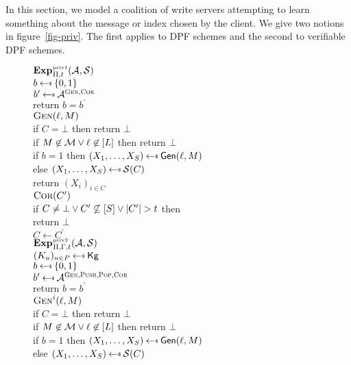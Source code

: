 %
\label{sec-security}

In this section, we model a coalition of write servers attempting to learn
something about the message or index chosen by the client. We give two notions
in figure~\ref{fig-priv}.
The first applies to DPF schemes and the second to verifiable DPF schemes.
\begin{figure}[t]
  \newcommand{\ctr}{\flagfont{ctr}}
  {
    \underline{$\game{\privone}_{\dpf,t}(\advA,\advS)$}\\[2pt]
    $b \getsr \bits$\\
    $b^\prime \getsr \advA^{\GENO,\CORO}$\\
    return $b=b^\prime$
    \\[6pt]
    \underline{$\textsc{Gen}(\ell,M)$}\\[2pt]
    if $C = \bot$ then return $\bot$\\
    if $M \not\in \mathcal{M} \vee \ell \not\in [L]$ then return $\bot$\\
    if $b=1$ then $(X_1, \ldots, X_\sharect) \getsr \gen(\idx,\msg)$\\
    else $(X_1, \ldots, X_\sharect) \getsr \advS(C)$\\
    return $(X_i)_{i\in C}$
    \\[6pt]
    \underline{$\textsc{Cor}(C^\prime)$}\\[2pt]
    if $C \ne \bot \vee C^\prime \not\subseteq [S] \vee |C^\prime| > t$
      then\\\ind return $\bot$\\
    $C \gets C^\prime$\\
  }
  {
    \underline{$\game{\privtwo}_{\dpf,\reqvfy,t}(\advA, \advS)$}\\[2pt]
    $(K_u)_{u\in P} \getsr \kg$\\
    $b \getsr \bits$\\
    $b^\prime \getsr \advA^{\GENO,\ENQO,\DEQO,\CORO}$\\
    return $b=b^\prime$
    \\[6pt]
    \underline{$\textsc{Gen}^i(\ell,M)$}\\[2pt]
    if $C = \bot$ then return $\bot$\\
    if $M \not\in \mathcal{M} \vee \ell \not\in [L]$ then return $\bot$\\
    if $b=1$ then $(X_1, \ldots, X_\sharect) \getsr \gen(\idx,\msg)$\\
    else $(X_1, \ldots, X_\sharect) \getsr \advS(C)$\\
}
\end{figure}
